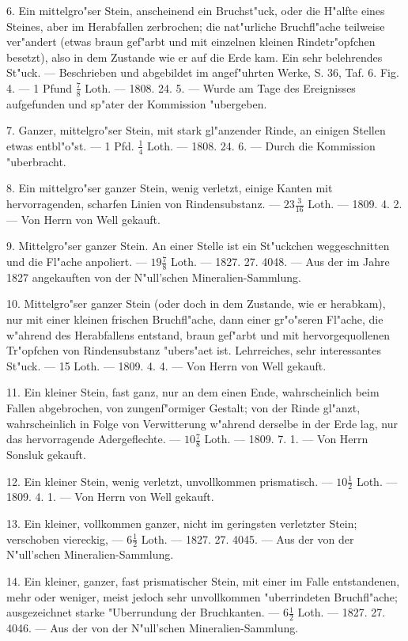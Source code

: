 \documentclass[a4paper, 11pt, oneside, polutonikogreek, german]{article}
\begin{document}
6. Ein mittelgro"ser Stein, anscheinend ein Bruchst"uck, oder die H"alfte eines Steines, aber im Herabfallen zerbrochen; die nat"urliche Bruchfl"ache teilweise ver"andert (etwas braun gef"arbt und mit einzelnen kleinen Rindetr"opfchen besetzt), also in dem Zustande wie er auf die Erde kam. Ein sehr belehrendes St"uck. --- Beschrieben und abgebildet im angef"uhrten Werke, S. 36, Taf. 6. Fig. 4. --- 1 Pfund $\frac{7}{8}$ Loth. --- 1808. 24. 5. --- Wurde am Tage des Ereignisses aufgefunden und sp"ater der Kommission "ubergeben.

7. Ganzer, mittelgro"ser Stein, mit stark gl"anzender Rinde, an einigen Stellen etwas entbl"o"st. --- 1 Pfd. $\frac{1}{4}$ Loth. --- 1808. 24. 6. --- Durch die Kommission "uberbracht.

8. Ein mittelgro"ser ganzer Stein, wenig verletzt, einige Kanten mit hervorragenden, scharfen Linien von Rindensubstanz. --- $23\frac{3}{16}$ Loth. --- 1809. 4. 2. --- Von Herrn von Well gekauft.

9. Mittelgro"ser ganzer Stein. An einer Stelle ist ein St"uckchen weggeschnitten und die Fl"ache anpoliert. --- $19\frac{7}{8}$ Loth. --- 1827. 27. 4048. --- Aus der im Jahre 1827 angekauften von der N"ull’schen Mineralien-Sammlung.

10. Mittelgro"ser ganzer Stein (oder doch in dem Zustande, wie er herabkam), nur mit einer kleinen frischen Bruchfl"ache, dann einer gr"o"seren Fl"ache, die w"ahrend des Herabfallens entstand, braun gef"arbt und mit hervorgequollenen Tr"opfchen von Rindensubstanz "ubers"aet ist. Lehrreiches, sehr interessantes St"uck. --- 15 Loth. --- 1809. 4. 4. --- Von Herrn von Well gekauft.

11. Ein kleiner Stein, fast ganz, nur an dem einen Ende, wahrscheinlich beim Fallen abgebrochen, von zungenf"ormiger Gestalt; von der Rinde gl"anzt, wahrscheinlich in Folge von Verwitterung w"ahrend derselbe in der Erde lag, nur das hervorragende Adergeflechte. --- $10\frac{7}{8}$ Loth. --- 1809. 7. 1. --- Von Herrn Sonsluk gekauft.

12. Ein kleiner Stein, wenig verletzt, unvollkommen prismatisch. --- $10\frac{1}{2}$ Loth. --- 1809. 4. 1. --- Von Herrn von Well gekauft.

13. Ein kleiner, vollkommen ganzer, nicht im geringsten verletzter Stein; verschoben viereckig, --- $6\frac{1}{2}$ Loth. --- 1827. 27. 4045. --- Aus der von der N"ull’schen Mineralien-Sammlung.

14. Ein kleiner, ganzer, fast prismatischer Stein, mit einer im Falle entstandenen, mehr oder weniger, meist jedoch sehr unvollkommen "uberrindeten Bruchfl"ache; ausgezeichnet starke "Uberrundung der Bruchkanten. --- $6\frac{1}{2}$ Loth. --- 1827. 27. 4046. --- Aus der von der N"ull’schen Mineralien-Sammlung.
\end{document}
